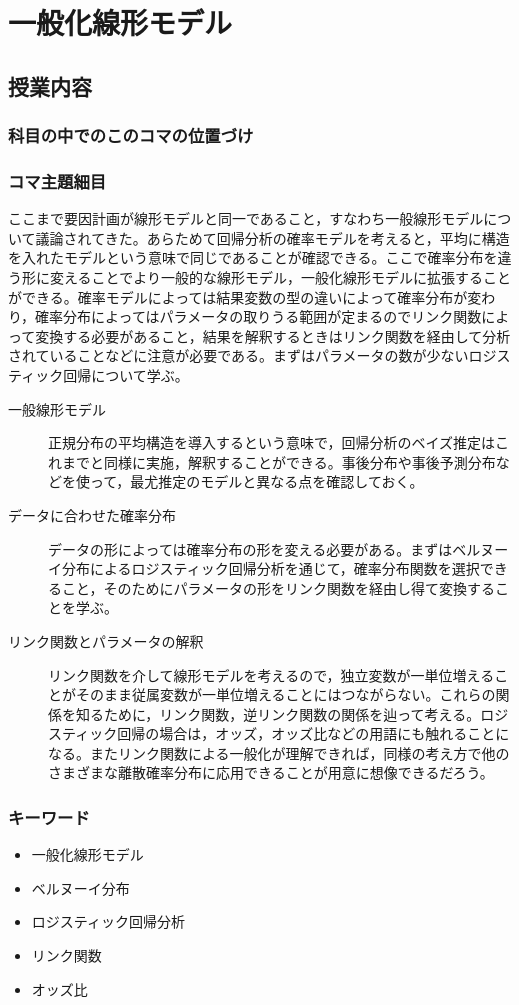\section{一般化線形モデル}
\subsection{授業内容}
\subsubsection{科目の中でのこのコマの位置づけ}
\subsubsection{コマ主題細目}
ここまで要因計画が線形モデルと同一であること，すなわち一般線形モデルについて議論されてきた。あらためて回帰分析の確率モデルを考えると，平均に構造を入れたモデルという意味で同じであることが確認できる。ここで確率分布を違う形に変えることでより一般的な線形モデル，一般化線形モデルに拡張することができる。確率モデルによっては結果変数の型の違いによって確率分布が変わり，確率分布によってはパラメータの取りうる範囲が定まるのでリンク関数によって変換する必要があること，結果を解釈するときはリンク関数を経由して分析されていることなどに注意が必要である。まずはパラメータの数が少ないロジスティック回帰について学ぶ。
\begin{description}
    \item[一般線形モデル] 正規分布の平均構造を導入するという意味で，回帰分析のベイズ推定はこれまでと同様に実施，解釈することができる。事後分布や事後予測分布などを使って，最尤推定のモデルと異なる点を確認しておく。
    \item[データに合わせた確率分布] データの形によっては確率分布の形を変える必要がある。まずはベルヌーイ分布によるロジスティック回帰分析を通じて，確率分布関数を選択できること，そのためにパラメータの形をリンク関数を経由し得て変換することを学ぶ。
    \item[リンク関数とパラメータの解釈] リンク関数を介して線形モデルを考えるので，独立変数が一単位増えることがそのまま従属変数が一単位増えることにはつながらない。これらの関係を知るために，リンク関数，逆リンク関数の関係を辿って考える。ロジスティック回帰の場合は，オッズ，オッズ比などの用語にも触れることになる。またリンク関数による一般化が理解できれば，同様の考え方で他のさまざまな離散確率分布に応用できることが用意に想像できるだろう。
\end{description}
\subsubsection{キーワード}
\begin{itemize}
    \item 一般化線形モデル
    \item ベルヌーイ分布
    \item ロジスティック回帰分析
    \item リンク関数
    \item オッズ比
\end{itemize}
